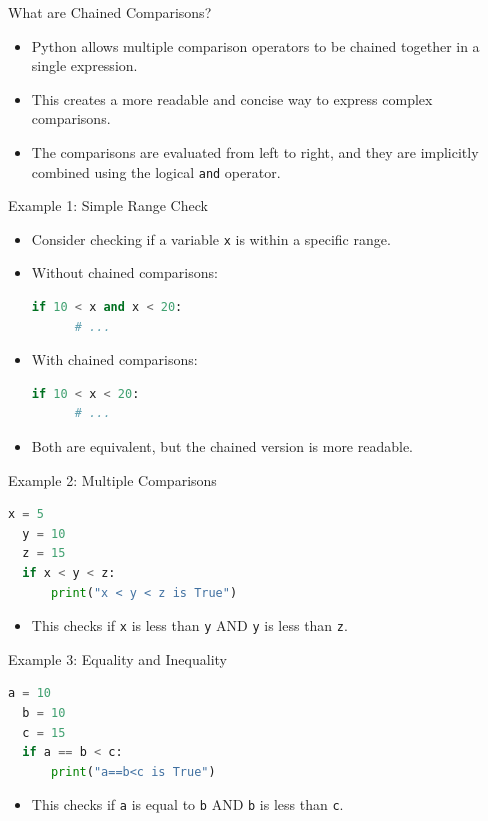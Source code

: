 \documentclass{beamer}
\begin{document}
\begin{frame}{What are Chained Comparisons?}
    \begin{itemize}
      \item Python allows multiple comparison operators to be chained together in a single expression.
      \item This creates a more readable and concise way to express complex comparisons.
      \item The comparisons are evaluated from left to right, and they are implicitly combined using the logical \texttt{and} operator.
    \end{itemize}
  \end{frame}
  
  \begin{frame}[fragile]{Example 1: Simple Range Check}
    \begin{itemize}
      \item Consider checking if a variable \texttt{x} is within a specific range.
      \item Without chained comparisons:
        \begin{lstlisting}[style=colorful, language=Python]
  if 10 < x and x < 20:
      # ...
        \end{lstlisting}
      \item With chained comparisons:
        \begin{lstlisting}[style=colorful, language=Python]
  if 10 < x < 20:
      # ...
        \end{lstlisting}
      \item Both are equivalent, but the chained version is more readable.
    \end{itemize}
  \end{frame}
  
  \begin{frame}[fragile]{Example 2: Multiple Comparisons}
    \begin{lstlisting}[style=colorful, language=Python]
  x = 5
  y = 10
  z = 15
  if x < y < z:
      print("x < y < z is True")
    \end{lstlisting}
    \begin{itemize}
      \item This checks if \texttt{x} is less than \texttt{y} AND \texttt{y} is less than \texttt{z}.
    \end{itemize}
  \end{frame}
  
  \begin{frame}[fragile]{Example 3: Equality and Inequality}
      \begin{lstlisting}[style=colorful, language=Python]
  a = 10
  b = 10
  c = 15
  if a == b < c:
      print("a==b<c is True")
      \end{lstlisting}
      \begin{itemize}
          \item This checks if \texttt{a} is equal to \texttt{b} AND \texttt{b} is less than \texttt{c}.
      \end{itemize}
  \end{frame}
  
\end{document}
